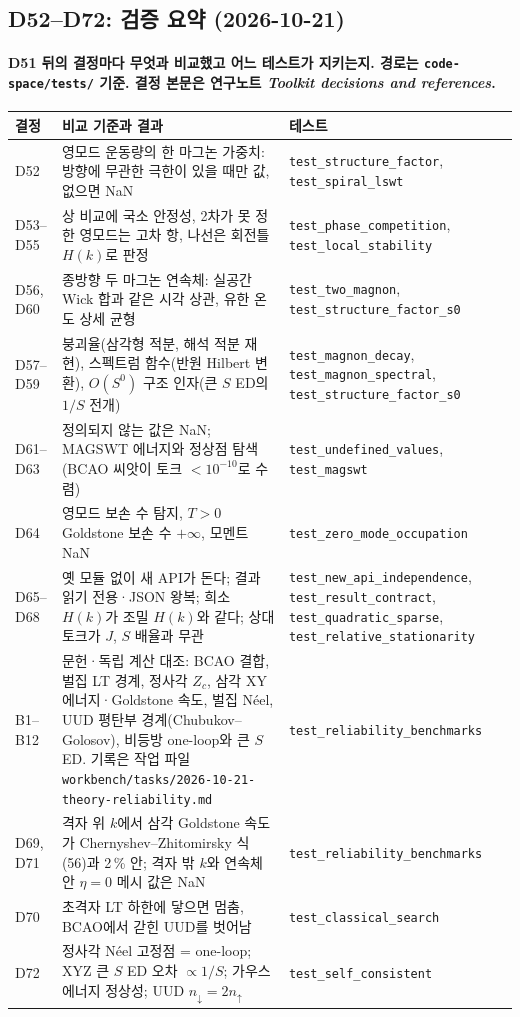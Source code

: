 \subsection{D52--D72: 검증 요약 (2026-10-21)}\label{d52-d72-summary}
\begingroup%
  \framesubtitle{D51 뒤의 결정마다 무엇과 비교했고 어느 테스트가 지키는지. 경로는 \texttt{code-space/tests/} 기준. 결정 본문은 연구노트 \emph{Toolkit decisions and references}.}
  \scriptsize\renewcommand{\arraystretch}{1.05}
  \begin{tabularx}{\textwidth}{@{}p{1.5cm}Yp{4.4cm}@{}}
    \toprule
    결정 & 비교 기준과 결과 & 테스트 \\
    \midrule
    D52 & 영모드 운동량의 한 마그논 가중치: 방향에 무관한 극한이 있을 때만 값, 없으면 NaN & \texttt{test\_structure\_factor}, \texttt{test\_spiral\_lswt} \\
    D53--D55 & 상 비교에 국소 안정성, 2차가 못 정한 영모드는 고차 항, 나선은 회전틀 $H(k)$로 판정 & \texttt{test\_phase\_competition}, \texttt{test\_local\_stability} \\
    D56, D60 & 종방향 두 마그논 연속체: 실공간 Wick 합과 같은 시각 상관, 유한 온도 상세 균형 & \texttt{test\_two\_magnon}, \texttt{test\_structure\_factor\_s0} \\
    D57--D59 & 붕괴율(삼각형 적분, 해석 적분 재현), 스펙트럼 함수(반원 Hilbert 변환), $O(S^0)$ 구조 인자(큰 $S$ ED의 $1/S$ 전개) & \texttt{test\_magnon\_decay}, \texttt{test\_magnon\_spectral}, \texttt{test\_structure\_factor\_s0} \\
    D61--D63 & 정의되지 않는 값은 NaN; MAGSWT 에너지와 정상점 탐색(BCAO 씨앗이 토크 $<10^{-10}$로 수렴) & \texttt{test\_undefined\_values}, \texttt{test\_magswt} \\
    D64 & 영모드 보손 수 탐지, $T>0$ Goldstone 보손 수 $+\infty$, 모멘트 NaN & \texttt{test\_zero\_mode\_occupation} \\
    D65--D68 & 옛 모듈 없이 새 API가 돈다; 결과 읽기 전용·JSON 왕복; 희소 $H(k)$가 조밀 $H(k)$와 같다; 상대 토크가 $J$, $S$ 배율과 무관 & \texttt{test\_new\_api\_independence}, \texttt{test\_result\_contract}, \texttt{test\_quadratic\_sparse}, \texttt{test\_relative\_stationarity} \\
    B1--B12 & 문헌·독립 계산 대조: BCAO 결합, 벌집 LT 경계, 정사각 $Z_c$, 삼각 XY 에너지·Goldstone 속도, 벌집 Néel, UUD 평탄부 경계(Chubukov--Golosov), 비등방 one-loop와 큰 $S$ ED. 기록은 작업 파일 \texttt{workbench/tasks/2026-10-21-theory-reliability.md} & \texttt{test\_reliability\_benchmarks} \\
    D69, D71 & 격자 위 $k$에서 삼각 Goldstone 속도가 Chernyshev--Zhitomirsky 식 (56)과 2\,\% 안; 격자 밖 $k$와 연속체 안 $\eta=0$ 메시 값은 NaN & \texttt{test\_reliability\_benchmarks} \\
    D70 & 초격자 LT 하한에 닿으면 멈춤, BCAO에서 갇힌 UUD를 벗어남 & \texttt{test\_classical\_search} \\
    D72 & 정사각 Néel 고정점 = one-loop; XYZ 큰 $S$ ED 오차 $\propto 1/S$; 가우스 에너지 정상성; UUD $n_\downarrow=2n_\uparrow$ & \texttt{test\_self\_consistent} \\
    \bottomrule
  \end{tabularx}
